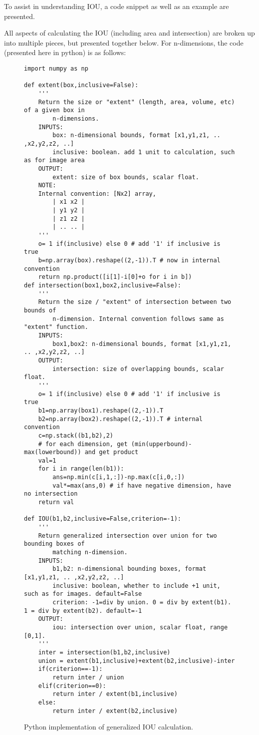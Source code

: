 To assist in understanding IOU, a code snippet as well as an example are presented.

All aspects of calculating the IOU (including area and intersection) are broken up into multiple pieces, but presented together below. For n-dimensions, the code (presented here in python) is as follows: 


\begin{figure}[H]
\begin{lstlisting}
import numpy as np

def extent(box,inclusive=False):
    '''
    Return the size or "extent" (length, area, volume, etc) of a given box in
        n-dimensions.
    INPUTS:
        box: n-dimensional bounds, format [x1,y1,z1, .. ,x2,y2,z2, ..]
        inclusive: boolean. add 1 unit to calculation, such as for image area
    OUTPUT:
        extent: size of box bounds, scalar float.
    NOTE:
    Internal convention: [Nx2] array,
        | x1 x2 |
        | y1 y2 |
        | z1 z2 |
        | .. .. |
    '''
    o= 1 if(inclusive) else 0 # add '1' if inclusive is true
    b=np.array(box).reshape((2,-1)).T # now in internal convention
    return np.product([i[1]-i[0]+o for i in b])
def intersection(box1,box2,inclusive=False):
    '''
    Return the size / "extent" of intersection between two bounds of
        n-dimension. Internal convention follows same as "extent" function.
    INPUTS:
        box1,box2: n-dimensional bounds, format [x1,y1,z1, .. ,x2,y2,z2, ..]
    OUTPUT:
        intersection: size of overlapping bounds, scalar float.
    '''
    o= 1 if(inclusive) else 0 # add '1' if inclusive is true
    b1=np.array(box1).reshape((2,-1)).T
    b2=np.array(box2).reshape((2,-1)).T # internal convention
    c=np.stack((b1,b2),2)
    # for each dimension, get (min(upperbound)-max(lowerbound)) and get product
    val=1
    for i in range(len(b1)):
        ans=np.min(c[i,1,:])-np.max(c[i,0,:])
        val*=max(ans,0) # if have negative dimension, have no intersection
    return val

def IOU(b1,b2,inclusive=False,criterion=-1):
    '''
    Return generalized intersection over union for two bounding boxes of
        matching n-dimension.
    INPUTS:
        b1,b2: n-dimensional bounding boxes, format [x1,y1,z1, .. ,x2,y2,z2, ..]
        inclusive: boolean, whether to include +1 unit, such as for images. default=False
        criterion: -1=div by union. 0 = div by extent(b1). 1 = div by extent(b2). default=-1
    OUTPUT:
        iou: intersection over union, scalar float, range [0,1].
    '''
    inter = intersection(b1,b2,inclusive)
    union = extent(b1,inclusive)+extent(b2,inclusive)-inter
    if(criterion==-1):
        return inter / union
    elif(criterion==0):
        return inter / extent(b1,inclusive)
    else:
        return inter / extent(b2,inclusive)

\end{lstlisting}
\onehalfspacing %
\caption{Python implementation of generalized IOU calculation.}
\label{code_iou}
\end{figure}

